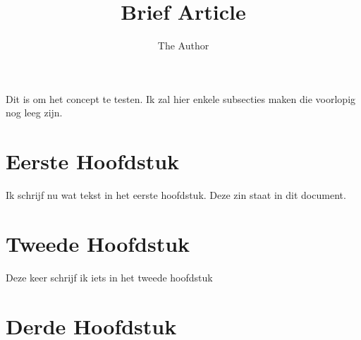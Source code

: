 \documentclass[11pt]{amsart}
\title{Brief Article}
\author{The Author}
\begin{document}
\maketitle

Dit is om het concept te testen.
 Ik zal hier enkele subsecties maken die voorlopig nog leeg zijn.
 
 \section{Eerste Hoofdstuk}
 Ik schrijf nu wat tekst in het eerste hoofdstuk.
 Deze zin staat in dit document.
 \section{Tweede Hoofdstuk}
 Deze keer schrijf ik iets in het tweede hoofdstuk
 \section{Derde Hoofdstuk}
\end{document}
